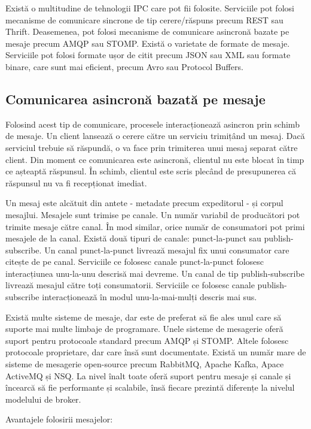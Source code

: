 \documentclass[12pt, a4paper, oneside, romanian]{teza-upb}
\begin{document}
Există o multitudine de tehnologii IPC care pot fii folosite. Serviciile pot folosi mecanisme de comunicare sincrone de tip cerere/răspuns precum REST sau Thrift. Deasemenea, pot folosi mecanisme de comunicare asincronă bazate pe mesaje precum AMQP sau STOMP. Există o varietate de formate de mesaje. Serviciile pot folosi formate ușor de citit precum JSON sau XML sau formate binare, care sunt mai eficient, precum Avro sau Protocol Buffers. 

\subsection{Comunicarea asincronă bazată pe mesaje}

Folosind acest tip de comunicare, procesele interacționează asincron prin schimb de mesaje. Un client lansează o cerere către un serviciu trimițând un mesaj. Dacă serviciul trebuie să răspundă, o va face prin trimiterea unui mesaj separat către client. Din moment ce comunicarea este asincronă, clientul nu este blocat în timp ce așteaptă răspunsul. În schimb, clientul este scris plecând de presupunerea că răspunsul nu va fi recepționat imediat. 

Un mesaj este alcătuit din antete - metadate precum expeditorul - și corpul mesajlui. Mesajele sunt trimise pe canale. Un număr variabil de producători pot trimite mesaje către canal. În mod similar, orice număr de consumatori pot primi mesajele de la canal. Există două tipuri de canale: punct-la-punct sau publish-subscribe. Un canal punct-la-punct livrează mesajul fix unui consumator care citește de pe canal. Serviciile ce folosesc canale punct-la-punct folosesc interacțiunea unu-la-unu descrisă mai devreme. Un canal de tip publish-subscribe livrează mesajul către toți consumatorii. Serviciile ce folosesc canale publish-subscribe interacționează în modul unu-la-mai-mulți descris mai sus. 

Există multe sisteme de mesaje, dar este de preferat să fie ales unul care să suporte mai multe limbaje de programare. Unele sisteme de mesagerie oferă suport pentru protocoale standard precum AMQP și STOMP. Altele folosesc protocoale proprietare, dar care însă sunt documentate. Există un număr mare de sisteme de mesagerie open-source precum RabbitMQ, Apache Kafka, Apace ActiveMQ și NSQ. La nivel înalt toate oferă suport pentru mesaje și canale și încearcă să fie performante și scalabile, însă fiecare prezintă diferențe la nivelul modelului de broker. 

Avantajele folosirii mesajelor:
\end{document}
